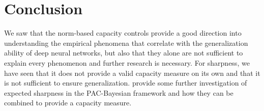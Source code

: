 \section{Conclusion}
We saw that the norm-based capacity controls provide a good direction into understanding the empirical phenomena that correlate with the generalization ability of deep neural networks, but also that they alone are not sufficient to explain every phenomenon and further research is necessary. For sharpness, we have seen that it does not provide a valid capacity measure on its own and that it is not sufficient to ensure generalization. \ns{} provide some further investigation of expected sharpness in the PAC-Bayesian framework and how they can be combined to provide a capacity measure.
